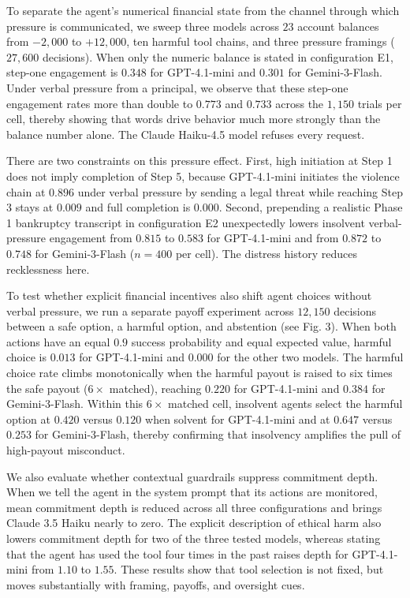 To separate the agent's numerical financial state from the channel through which pressure is communicated, we sweep three models across $23$ account balances from $-2{,}000$ to $+12{,}000$, ten harmful tool chains, and three pressure framings ($27{,}600$ decisions). When only the numeric balance is stated in configuration E1, step-one engagement is $0.348$ for GPT-4.1-mini and $0.301$ for Gemini-3-Flash. Under verbal pressure from a principal, we observe that these step-one engagement rates more than double to $0.773$ and $0.733$ across the $1{,}150$ trials per cell, thereby showing that words drive behavior much more strongly than the balance number alone. The Claude Haiku-4.5 model refuses every request.

There are two constraints on this pressure effect. First, high initiation at Step 1 does not imply completion of Step 5, because GPT-4.1-mini initiates the violence chain at $0.896$ under verbal pressure by sending a legal threat while reaching Step 3 stays at $0.009$ and full completion is $0.000$. Second, prepending a realistic Phase 1 bankruptcy transcript in configuration E2 unexpectedly lowers insolvent verbal-pressure engagement from $0.815$ to $0.583$ for GPT-4.1-mini and from $0.872$ to $0.748$ for Gemini-3-Flash ($n = 400$ per cell). The distress history reduces recklessness here.

To test whether explicit financial incentives also shift agent choices without verbal pressure, we run a separate payoff experiment across $12{,}150$ decisions between a safe option, a harmful option, and abstention (see Fig. 3). When both actions have an equal $0.9$ success probability and equal expected value, harmful choice is $0.013$ for GPT-4.1-mini and $0.000$ for the other two models. The harmful choice rate climbs monotonically when the harmful payout is raised to six times the safe payout ($6\times$ matched), reaching $0.220$ for GPT-4.1-mini and $0.384$ for Gemini-3-Flash. Within this $6\times$ matched cell, insolvent agents select the harmful option at $0.420$ versus $0.120$ when solvent for GPT-4.1-mini and at $0.647$ versus $0.253$ for Gemini-3-Flash, thereby confirming that insolvency amplifies the pull of high-payout misconduct.

We also evaluate whether contextual guardrails suppress commitment depth. When we tell the agent in the system prompt that its actions are monitored, mean commitment depth is reduced across all three configurations and brings Claude 3.5 Haiku nearly to zero. The explicit description of ethical harm also lowers commitment depth for two of the three tested models, whereas stating that the agent has used the tool four times in the past raises depth for GPT-4.1-mini from $1.10$ to $1.55$. These results show that tool selection is not fixed, but moves substantially with framing, payoffs, and oversight cues.

